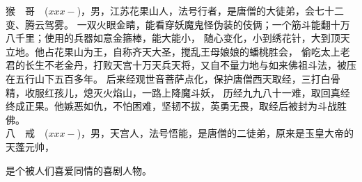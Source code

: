 \documentclass[a4paper,11pt,onecolumn,twoside]{ctexart}
\begin{document}
\begin{multicols}{2}
\begin{thebibliography}{99}
\end{thebibliography}
\normalsize
\indent 猴~~哥~~($xxx-$)，男，江苏花果山人，法号行者，是唐僧的大徒弟，会七十二变、腾云驾雾。
一双火眼金睛，能看穿妖魔鬼怪伪装的伎俩；一个筋斗能翻十万八千里；使用的兵器如意金箍棒，能大能小，
随心变化，小到绣花针，大到顶天立地。他占花果山为王，自称齐天大圣，搅乱王母娘娘的蟠桃胜会，
偷吃太上老君的长生不老金丹，打败天宫十万天兵天将，又自不量力地与如来佛祖斗法，被压在五行山下五百多年。
后来经观世音菩萨点化，保护唐僧西天取经，三打白骨精，收服红孩儿，熄灭火焰山，一路上降魔斗妖，
历经九九八十一难，取回真经终成正果。他嫉恶如仇，不怕困难，坚韧不拔，英勇无畏，取经后被封为斗战胜佛。\\
\indent 八~~戒~~($xxx-$)，男，天宫人，法号悟能，是唐僧的二徒弟，原来是玉皇大帝的天蓬元帅，

是个被人们喜爱同情的喜剧人物。
\end{multicols}
\clearpage
\end{document}
